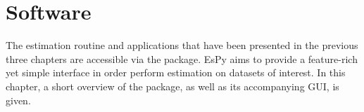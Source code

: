 \chapter{Software}
\label{chap:nmrespy}

The estimation routine and applications that have been
presented in the previous three chapters are accessible via the 
package. \ac{EsPy} aims to provide a feature-rich yet simple interface in order
perform estimation on datasets of interest. In this chapter, a short
overview of the package, as well as its accompanying \ac{GUI}, is given.




